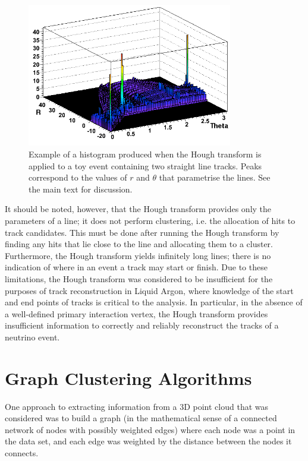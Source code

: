 \begin{figure}
    \centering
    \includegraphics[width=0.8\textwidth]{chapters/otheralg_images/hough-histogram}
    \caption{\label{fig:hough_histogram}Example of a histogram produced when the Hough transform is applied to a toy event containing two straight line tracks. Peaks correspond to the values of $r$ and $\theta$ that parametrise the lines. See the main text for discussion.}
\end{figure}

It should be noted, however, that the Hough transform provides only the parameters of a line; it does not perform clustering, i.e. the allocation of hits to track candidates. This must be done after running the Hough transform by finding any hits that lie close to the line and allocating them to a cluster. Furthermore, the Hough transform yields infinitely long lines; there is no indication of where in an event a track may start or finish. Due to these limitations, the Hough transform was considered to be insufficient for the purposes of track reconstruction in Liquid Argon, where knowledge of the start and end points of tracks is critical to the analysis. In particular, in the absence of a well-defined primary interaction vertex, the Hough transform provides insufficient information to correctly and reliably reconstruct the tracks of a neutrino event.

\section{Graph Clustering Algorithms}
One approach to extracting information from a 3D point cloud that was considered was to build a graph (in the mathematical sense of a connected network of nodes with possibly weighted edges) where each node was a point in the data set, and each edge was weighted by the distance between the nodes it connects.

